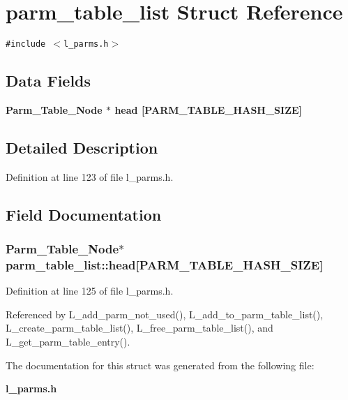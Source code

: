 \section{parm\_\-table\_\-list Struct Reference}
\label{structparm__table__list}
{\tt \#include $<$l\_\-parms.h$>$}

\subsection*{Data Fields}
\begin{CompactItemize}
\item 
\bf{Parm\_\-Table\_\-Node} $\ast$ \bf{head} [PARM\_\-TABLE\_\-HASH\_\-SIZE]
\end{CompactItemize}


\subsection{Detailed Description}




Definition at line 123 of file l\_\-parms.h.

\subsection{Field Documentation}
\subsubsection{\setlength{\rightskip}{0pt plus 5cm}\bf{Parm\_\-Table\_\-Node}$\ast$ \bf{parm\_\-table\_\-list::head}[PARM\_\-TABLE\_\-HASH\_\-SIZE]}\label{structparm__table__list_140cd03c4dfcd9b3e45f987595bd75d6}




Definition at line 125 of file l\_\-parms.h.

Referenced by L\_\-add\_\-parm\_\-not\_\-used(), L\_\-add\_\-to\_\-parm\_\-table\_\-list(), L\_\-create\_\-parm\_\-table\_\-list(), L\_\-free\_\-parm\_\-table\_\-list(), and L\_\-get\_\-parm\_\-table\_\-entry().

The documentation for this struct was generated from the following file:\begin{CompactItemize}
\item 
\bf{l\_\-parms.h}\end{CompactItemize}
